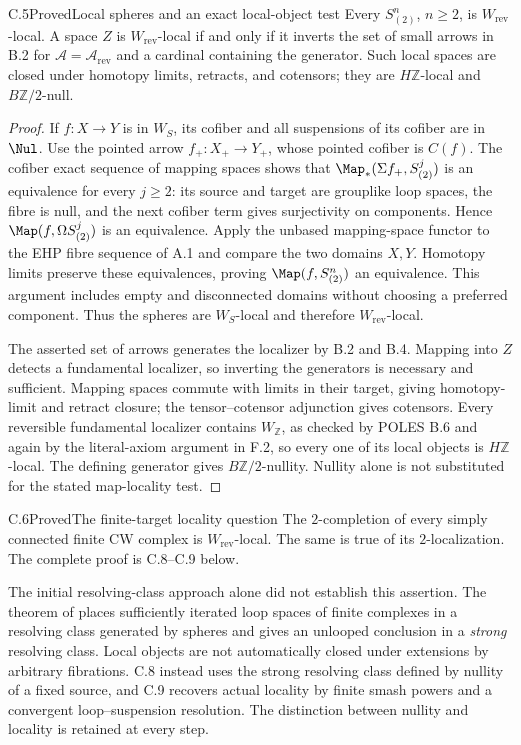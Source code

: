 \begin{claim}{C.5}{Proved}{Local spheres and an exact local-object test}
Every $S^n_{(2)}$, $n\geq2$, is $W_{\mathrm{rev}}$-local. A space $Z$ is $W_{\mathrm{rev}}$-local if and only if it inverts the set of small arrows in B.2 for $\mathcal A=\mathcal A_{\mathrm{rev}}$ and a cardinal containing the generator. Such local spaces are closed under homotopy limits, retracts, and cotensors; they are $H\mathbb Z$-local and $B\mathbb Z/2$-null.
\end{claim}
\begin{proof}
If $f:X\to Y$ is in $W_S$, its cofiber and all suspensions of its cofiber are in $\Nul$. Use the pointed arrow $f_+:X_+\to Y_+$, whose pointed cofiber is $C(f)$. The cofiber exact sequence of mapping spaces shows that $\Map_*(\Sigma f_+,S^j_{(2)})$ is an equivalence for every $j\geq2$: its source and target are grouplike loop spaces, the fibre is null, and the next cofiber term gives surjectivity on components. Hence $\Map(f,\Omega S^j_{(2)})$ is an equivalence. Apply the unbased mapping-space functor to the EHP fibre sequence of A.1 and compare the two domains $X,Y$. Homotopy limits preserve these equivalences, proving $\Map(f,S^n_{(2)})$ an equivalence. This argument includes empty and disconnected domains without choosing a preferred component. Thus the spheres are $W_S$-local and therefore $W_{\mathrm{rev}}$-local.

The asserted set of arrows generates the localizer by B.2 and B.4. Mapping into $Z$ detects a fundamental localizer, so inverting the generators is necessary and sufficient. Mapping spaces commute with limits in their target, giving homotopy-limit and retract closure; the tensor--cotensor adjunction gives cotensors. Every reversible fundamental localizer contains $W_{\mathbb Z}$, as checked by POLES B.6 and again by the literal-axiom argument in F.2, so every one of its local objects is $H\mathbb Z$-local. The defining generator gives $B\mathbb Z/2$-nullity. Nullity alone is not substituted for the stated map-locality test.
\end{proof}

\begin{claim}{C.6}{Proved}{The finite-target locality question}
The $2$-completion of every simply connected finite CW complex is $W_{\mathrm{rev}}$-local. The same is true of its $2$-localization. The complete proof is C.8--C.9 below.
\end{claim}
The initial resolving-class approach alone did not establish this assertion. The theorem of \citet[Theorem 8 and Corollaries 9 and 11]{Strom2003} places sufficiently iterated loop spaces of finite complexes in a resolving class generated by spheres and gives an unlooped conclusion in a \emph{strong} resolving class. Local objects are not automatically closed under extensions by arbitrary fibrations. C.8 instead uses the strong resolving class defined by nullity of a fixed source, and C.9 recovers actual locality by finite smash powers and a convergent loop--suspension resolution. The distinction between nullity and locality is retained at every step.

